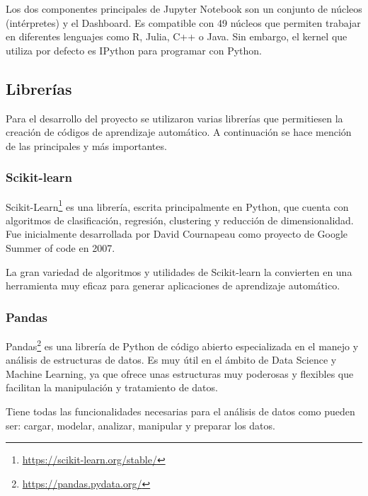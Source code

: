 \documentclass[a4paper, 12pt]{book}
\begin{document}
Los dos componentes principales de Jupyter Notebook son un conjunto de núcleos (intérpretes) y el Dashboard. Es compatible con 49 núcleos que permiten trabajar en diferentes lenguajes como R, Julia, C++ o Java. Sin embargo, el kernel que utiliza por defecto es IPython para programar con Python. 

\subsection{Librerías}
\label{subsec:Librerías}
Para el desarrollo del proyecto se utilizaron varias librerías que permitiesen la creación de códigos de aprendizaje automático. A continuación se hace mención de las principales y más importantes.

\subsubsection{Scikit-learn}
\label{subsubsec:Scikit-learn}
Scikit-Learn\footnote{\url{https://scikit-learn.org/stable/}} es una librería, escrita principalmente en Python, que cuenta con algoritmos de clasificación, regresión, clustering y reducción de dimensionalidad. Fue inicialmente desarrollada por David Cournapeau como proyecto de Google Summer of code en 2007.

La gran variedad de algoritmos y utilidades de Scikit-learn la convierten en una herramienta muy eficaz para generar aplicaciones de aprendizaje automático.

\subsubsection{Pandas}
\label{subsubsec:Pandas}

Pandas\footnote{\url{https://pandas.pydata.org/}} es una librería de Python de código abierto especializada en el manejo y análisis de estructuras de datos. Es muy útil en el ámbito de Data Science y Machine Learning, ya que ofrece unas estructuras muy poderosas y flexibles que facilitan la manipulación y tratamiento de datos.

Tiene todas las funcionalidades necesarias para el análisis de datos como pueden ser: cargar, modelar, analizar, manipular y preparar los datos.

\end{document}
